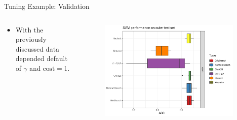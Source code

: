 \begin{frame}{Tuning Example: Validation}

\begin{columns}
\begin{column}{0.4\textwidth}
  \footnotesize

  \begin{itemize}
      \item With the previously discussed data depended default of $\gamma$ and $\text{cost} = 1$.
  \end{itemize}
\end{column}
\begin{column}{0.6\textwidth}
  \begin{figure}
  \includegraphics[width=\textwidth]{images/benchmark_boxplot_all.png}
  \end{figure}
\end{column}
\end{columns}
\end{frame}
